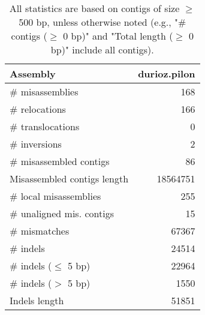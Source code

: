 \documentclass[12pt,a4paper]{article}
\begin{document}
\begin{table}[ht]
\begin{center}
\caption{All statistics are based on contigs of size $\geq$ 500 bp, unless otherwise noted (e.g., "\# contigs ($\geq$ 0 bp)" and "Total length ($\geq$ 0 bp)" include all contigs).}
\begin{tabular}{|l*{1}{|r}|}
\hline
Assembly & durioz.pilon \\ \hline
\# misassemblies & 168 \\ \hline
\hspace{5mm}\# relocations & 166 \\ \hline
\hspace{5mm}\# translocations & 0 \\ \hline
\hspace{5mm}\# inversions & 2 \\ \hline
\# misassembled contigs & 86 \\ \hline
Misassembled contigs length & 18564751 \\ \hline
\# local misassemblies & 255 \\ \hline
\# unaligned mis. contigs & 15 \\ \hline
\# mismatches & 67367 \\ \hline
\# indels & 24514 \\ \hline
\hspace{5mm}\# indels ($\leq$ 5 bp) & 22964 \\ \hline
\hspace{5mm}\# indels ($>$ 5 bp) & 1550 \\ \hline
Indels length & 51851 \\ \hline
\end{tabular}
\end{center}
\end{table}
\end{document}
